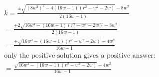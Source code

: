 \begin{align*}
k = \frac{\pm \sqrt{\left(8 w^2\right)^2-4 (16 w-1) \left(r^2-w^2-2 w\right)}-8 w^2}{2(16 w-1)} \\
=\frac{\pm 2 \sqrt{16 w^4- (16 w-1) \left(r^2-w^2-2 w\right)}-8 w^2}{2(16 w-1)} \\
=\frac{\pm \sqrt{16 w^4- (16 w-1) \left(r^2-w^2-2 w\right)}-4 w^2}{16 w-1} \\
\text{only the positive solution gives a positive answer:} \\
= \frac{ \sqrt{16 w^4- (16 w-1) \left(r^2-w^2-2 w\right)}-4 w^2}{16 w-1}
\end{align*}






